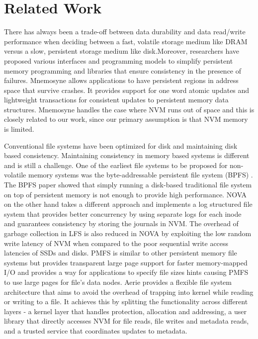 
\section{Related Work}

There has always been a trade-off between data durability and data read/write performance when deciding between a fast, volatile storage medium like DRAM versus a slow, persistent storage medium like disk.Moreover, researchers have proposed various interfaces and programming models \cite{c4,c6} to simplify persistent memory programming and libraries that ensure consistency in the presence of failures. Mnemosyne \cite{c6} allows applications to have persistent regions in address space that survive crashes. It provides support for one word atomic updates and lightweight transactions for consistent updates to persistent memory data structures. Mnemosyne handles the case where NVM runs out of space and this is closely related to our work, since our primary assumption is that NVM memory is limited. 

Conventional file systems have been optimized for disk and maintaining disk based consistency. Maintaining consistency in memory based systems is different and is still a challenge. One of the earliest file systems to be proposed for non-volatile memory systems was the byte-addressable persistent file system (BPFS) \cite{c10}. The BPFS paper showed that simply running a disk-based traditional file system on top of persistent memory is not enough to provide high performance. NOVA \cite{c8} on the other hand takes a different approach and implements a log structured file system that provides better concurrency by using separate logs for each inode and guarantees consistency by storing the journals in NVM. The overhead of garbage collection in LFS is also reduced in NOVA by exploiting the low random write latency of NVM when compared to the poor sequential write access latencies of SSDs and disks. PMFS \cite{c3} is similar to other persistent memory file systems but provides transparent large page support for faster memory-mapped I/O and provides a way for applications to specify file sizes hints causing PMFS to use large pages for file’s data nodes. Aerie \cite{c5} provides a flexible file system architecture that aims to avoid the overhead of trapping into kernel while reading or writing to a file. It achieves this by splitting the functionality across different layers - a kernel layer that handles protection, allocation and addressing, a user library that directly accesses NVM for file reads, file writes and metadata reads, and a trusted service that coordinates updates to metadata.  
 
